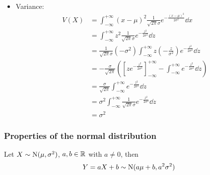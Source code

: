 \documentclass[12pt]{extarticle}
\newcommand{\Normal}{{\operatorfont N}}
\begin{document}
\begin{itemize}
    \item Variance:
          \begin{align}
              V(X) & = \int_{-\infty}^{+\infty} (x - \mu)^2 \frac{1}{\sqrt{2\pi} \sigma} e^{-\frac{(x-\mu)^2}{2\sigma^2}} \dd{x}                                                               \\
                   & = \int_{-\infty}^{+\infty} z^2 \frac{1}{\sqrt{2\pi} \sigma} e^{-\frac{z^2}{2\sigma^2}} \dd{z}                                                                             \\
                   & = \frac{1}{\sqrt{2\pi} \sigma}(-\sigma^2) \int_{-\infty}^{+\infty} z \left(- \frac{z}{\sigma^2}\right) e^{-\frac{z^2}{2\sigma^2}} \dd{z}                                  \\
                   & = -\frac{\sigma}{\sqrt{2\pi}} \left( \left[ z e^{-\frac{z^2}{2\sigma^2}} \right]_{-\infty}^{+\infty} - \int_{-\infty}^{+\infty} e^{-\frac{z^2}{2\sigma^2}} \dd{z} \right) \\
                   & = \frac{\sigma}{\sqrt{2\pi}} \int_{-\infty}^{+\infty} e^{-\frac{z^2}{2\sigma^2}} \dd{z}                                                                                   \\
                   & = \sigma^2 \int_{-\infty}^{+\infty} \frac{1}{\sqrt{2\pi} \sigma} e^{-\frac{z^2}{2\sigma^2}} \dd{z}                                                                        \\
                   & = \sigma^2
          \end{align}
\end{itemize}

\subsubsection{Properties of the normal distribution}


\begin{theorem}
    Let $X \sim \Normal(\mu, \sigma^2)$, $a, b \in \mathbb{R}$ with $a \neq 0$, then
    \begin{equation}
        Y = aX + b \sim \Normal(a\mu + b, a^2 \sigma^2)
    \end{equation}
\end{theorem}
\end{document}

